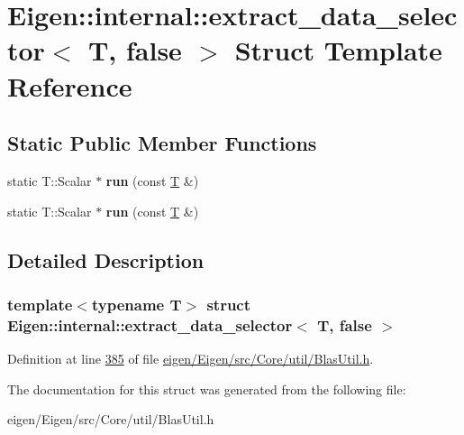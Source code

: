\hypertarget{struct_eigen_1_1internal_1_1extract__data__selector_3_01_t_00_01false_01_4}{}\section{Eigen\+:\+:internal\+:\+:extract\+\_\+data\+\_\+selector$<$ T, false $>$ Struct Template Reference}
\label{struct_eigen_1_1internal_1_1extract__data__selector_3_01_t_00_01false_01_4}
\subsection*{Static Public Member Functions}
\begin{DoxyCompactItemize}
\item 
\mbox{\label{struct_eigen_1_1internal_1_1extract__data__selector_3_01_t_00_01false_01_4_a6ec6fde1bf0c2368ca1c72ba6bdb0fb7}} 
static T\+::\+Scalar $\ast$ {\bfseries run} (const \hyperlink{group___sparse_core___module}{T} \&)
\item 
\mbox{\label{struct_eigen_1_1internal_1_1extract__data__selector_3_01_t_00_01false_01_4_a6ec6fde1bf0c2368ca1c72ba6bdb0fb7}} 
static T\+::\+Scalar $\ast$ {\bfseries run} (const \hyperlink{group___sparse_core___module}{T} \&)
\end{DoxyCompactItemize}


\subsection{Detailed Description}
\subsubsection*{template$<$typename T$>$\newline
struct Eigen\+::internal\+::extract\+\_\+data\+\_\+selector$<$ T, false $>$}



Definition at line \hyperlink{eigen_2_eigen_2src_2_core_2util_2_blas_util_8h_source_l00385}{385} of file \hyperlink{eigen_2_eigen_2src_2_core_2util_2_blas_util_8h_source}{eigen/\+Eigen/src/\+Core/util/\+Blas\+Util.\+h}.



The documentation for this struct was generated from the following file\+:\begin{DoxyCompactItemize}
\item 
eigen/\+Eigen/src/\+Core/util/\+Blas\+Util.\+h\end{DoxyCompactItemize}
